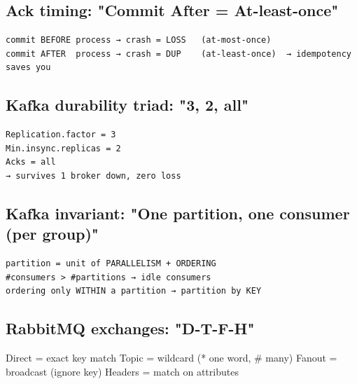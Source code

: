 \documentclass[11pt]{article}
\newenvironment{Shaded}{\begin{snugshade}}{\end{snugshade}}
\newcommand{\CommentTok}[1]{\textcolor[rgb]{0.48,0.49,0.49}{#1}}
\newcommand{\NormalTok}[1]{\textcolor[rgb]{0.81,0.81,0.76}{#1}}
\newcommand{\OperatorTok}[1]{\textcolor[rgb]{0.81,0.81,0.76}{#1}}
\begin{document}
\subsection{Ack timing: "Commit After = At-least-once"}\label{ack-timing-commit-after--at-least-once}

\setcodelang{}

\begin{verbatim}
commit BEFORE process → crash = LOSS   (at-most-once)
commit AFTER  process → crash = DUP    (at-least-once)  → idempotency saves you
\end{verbatim}

\subsection{Kafka durability triad: "3, 2, all"}\label{kafka-durability-triad-3-2-all}

\setcodelang{}

\begin{verbatim}
Replication.factor = 3
Min.insync.replicas = 2
Acks = all
→ survives 1 broker down, zero loss
\end{verbatim}

\subsection{Kafka invariant: "One partition, one consumer (per group)"}\label{kafka-invariant-one-partition-one-consumer-per-group}

\setcodelang{}

\begin{verbatim}
partition = unit of PARALLELISM + ORDERING
#consumers > #partitions → idle consumers
ordering only WITHIN a partition → partition by KEY
\end{verbatim}

\subsection{RabbitMQ exchanges: "D-T-F-H"}\label{rabbitmq-exchanges-d-t-f-h}


\begin{Shaded}
\begin{Highlighting}[]
\NormalTok{Direct  }\OperatorTok{=}\NormalTok{ exact key match}
\NormalTok{Topic   }\OperatorTok{=}\NormalTok{ wildcard (}\OperatorTok{*}\NormalTok{ one word, }\CommentTok{\# many)}
\NormalTok{Fanout  }\OperatorTok{=}\NormalTok{ broadcast (ignore key)}
\NormalTok{Headers }\OperatorTok{=}\NormalTok{ match on attributes}
\end{Highlighting}
\end{Shaded}
\end{document}
